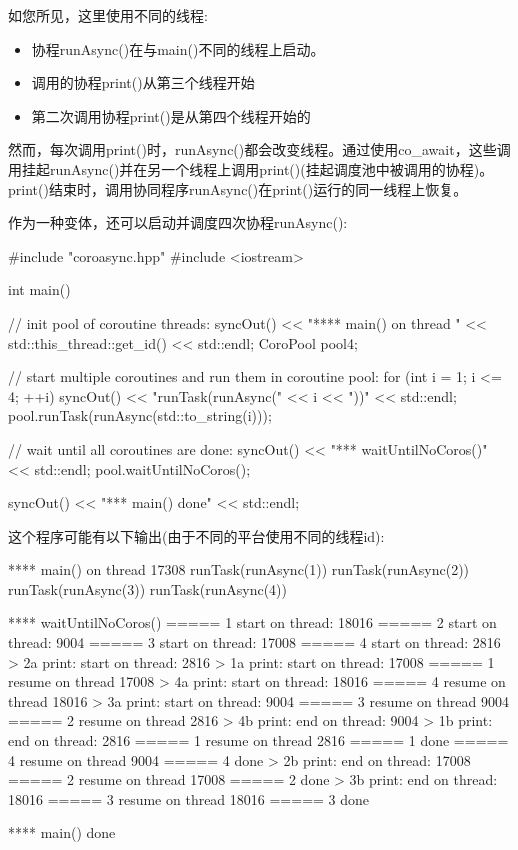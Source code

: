 如您所见，这里使用不同的线程:

\begin{itemize}
\item 
协程runAsync()在与main()不同的线程上启动。

\item 
调用的协程print()从第三个线程开始

\item 
第二次调用协程print()是从第四个线程开始的
\end{itemize}

然而，每次调用print()时，runAsync()都会改变线程。通过使用co\_await，这些调用挂起runAsync()并在另一个线程上调用print()(挂起调度池中被调用的协程)。print()结束时，调用协同程序runAsync()在print()运行的同一线程上恢复。

作为一种变体，还可以启动并调度四次协程runAsync():


\begin{cpp}
#include "coroasync.hpp"
#include <iostream>

int main()
{
	// init pool of coroutine threads:
	syncOut() << "**** main() on thread " << std::this_thread::get_id()
			  << std::endl;
	CoroPool pool{4};
	
	// start multiple coroutines and run them in coroutine pool:
	for (int i = 1; i <= 4; ++i) {
		syncOut() << "runTask(runAsync(" << i << "))" << std::endl;
		pool.runTask(runAsync(std::to_string(i)));
	}
	
	// wait until all coroutines are done:
	syncOut() << "\n**** waitUntilNoCoros()" << std::endl;
	pool.waitUntilNoCoros();
	
	syncOut() << "\n**** main() done" << std::endl;
}
\end{cpp}

这个程序可能有以下输出(由于不同的平台使用不同的线程id):

\begin{shell}
**** main() on thread 17308
runTask(runAsync(1))
runTask(runAsync(2))
runTask(runAsync(3))
runTask(runAsync(4))

**** waitUntilNoCoros()
===== 1 start on thread: 18016
===== 2 start on thread: 9004
===== 3 start on thread: 17008
===== 4 start on thread: 2816
    > 2a print: start on thread: 2816
    > 1a print: start on thread: 17008
===== 1 resume on thread 17008
    > 4a print: start on thread: 18016
===== 4 resume on thread 18016
    > 3a print: start on thread: 9004
===== 3 resume on thread 9004
===== 2 resume on thread 2816
    > 4b print: end on thread: 9004
    > 1b print: end on thread: 2816
===== 1 resume on thread 2816
===== 1 done
===== 4 resume on thread 9004
===== 4 done
    > 2b print: end on thread: 17008
===== 2 resume on thread 17008
===== 2 done
    > 3b print: end on thread: 18016
===== 3 resume on thread 18016
===== 3 done

**** main() done
\end{shell}

